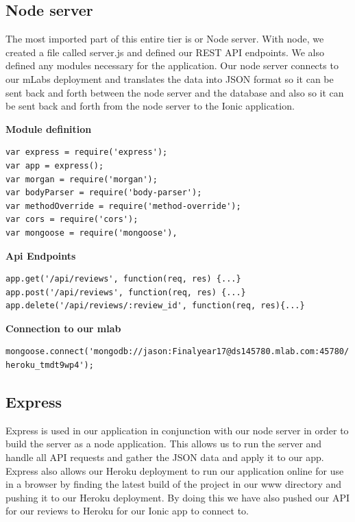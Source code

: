\subsection{ Node server}
The most imported part of this entire tier is or Node server. With node, we created a file called server.js and defined our REST API endpoints. We also defined any modules necessary for the application. Our node server connects to our mLabs deployment and translates the data into JSON format so it can be sent back and forth between the node server and the database and also so it can be sent back and forth from the node server to the Ionic application.

\textbf {Module definition}
\begin{verbatim}
var express = require('express');
var app = express();
var morgan = require('morgan');
var bodyParser = require('body-parser');
var methodOverride = require('method-override');
var cors = require('cors');
var mongoose = require('mongoose'),

\end{verbatim}

\textbf{Api Endpoints}

\begin{verbatim}
app.get('/api/reviews', function(req, res) {...}
app.post('/api/reviews', function(req, res) {...}
app.delete('/api/reviews/:review_id', function(req, res){...}

\end{verbatim}

\textbf {Connection to our mlab}

\begin{verbatim}
mongoose.connect('mongodb://jason:Finalyear17@ds145780.mlab.com:45780/
heroku_tmdt9wp4');
\end{verbatim}

\subsection{Express}
Express is used in our application in conjunction with our node server in order to build the server as a node application. This allows us to run the server and handle all API requests and gather the JSON data and apply it to our app. Express also allows our Heroku deployment to run our application online for use in a browser by finding the latest build of the project in our www directory and pushing it to our Heroku deployment. By doing this we have also pushed our API for our reviews to Heroku for our Ionic app to connect to.

